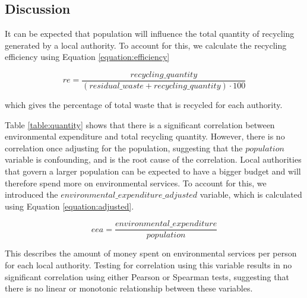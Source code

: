 \documentclass[11pt,conference]{IEEEtran}
\begin{document}
\subsection{Discussion}
It can be expected that population will influence the total quantity of recycling generated by a local authority. To account for this, we calculate the recycling efficiency using Equation \ref{equation:efficiency}

\begin{equation}
re = \frac{recycling\_quantity}{(residual\_waste + recycling\_quantity) \cdot 100}
\label{equation:efficiency}
\end{equation}

which gives the percentage of total waste that is recycled for each authority.

Table \ref{table:quantity} shows that there is a significant correlation between environmental expenditure and total recycling quantity. However, there is no correlation once adjusting for the population, suggesting that the $population$ variable is confounding, and is the root cause of the correlation. Local authorities that govern a larger population can be expected to have a bigger budget and will therefore spend more on environmental services. To account for this, we introduced the $environmental\_expenditure\_adjusted$ variable, which is calculated using Equation \ref{equation:adjusted}.

\begin{equation}
eea =\frac{environmental\_expenditure}{population}
\label{equation:adjusted}
\end{equation}

This describes the amount of money spent on environmental services per person for each local authority. Testing for correlation using this variable results in no significant correlation using either Pearson or Spearman tests, suggesting that there is no linear or monotonic relationship between these variables.
\end{document}
